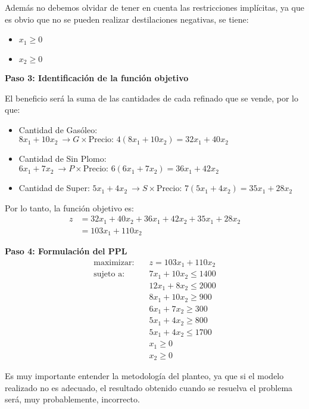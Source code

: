\noindent Además no debemos olvidar de tener en cuenta las restricciones implícitas, ya que es obvio que no se pueden realizar destilaciones negativas, se tiene:
\begin{itemize}
  \item \(x_1 \geq 0\)
  \item \(x_2 \geq 0\)
\end{itemize}

\noindent\textbf{Paso 3: Identificación de la función objetivo}

El beneficio será la suma de las cantidades de cada refinado que se vende, por lo que:
\begin{itemize}
  \item Cantidad de Gasóleo: \(8x_1 + 10x_2 ~ \rightarrow G \times \text{Precio: } 4(8x_1 + 10x_2) = 32x_1 + 40x_2\)
  \item Cantidad de Sin Plomo: \(6x_1 + 7x_2 ~ \rightarrow P \times \text{Precio: } 6(6x_1 + 7x_2) = 36x_1 + 42x_2\)
  \item Cantidad de Super: \(5x_1 + 4x_2 ~ \rightarrow S \times \text{Precio: } 7(5x_1 + 4x_2) = 35x_1 + 28x_2\) 
\end{itemize}

\noindent Por lo tanto, la función objetivo es:
\begin{align*}
  z &= 32x_1 + 40x_2 + 36x_1 + 42x_2 + 35x_1 + 28x_2 \\
    &= 103x_1 + 110x_2
\end{align*}

\noindent\textbf{Paso 4: Formulación del PPL}
\begin{align*}
  \text{maximizar:} \quad   &z = 103x_1 + 110x_2 \\[3pt]
  \text{sujeto a:} \quad    &7x_1 + 10x_2 \leq 1400 \\
                            &12x_1 + 8x_2 \leq 2000 \\
                            &8x_1 + 10x_2 \geq 900 \\
                            &6x_1 + 7x_2 \geq 300 \\
                            &5x_1 + 4x_2 \geq 800 \\
                            & 5x_1 + 4x_2 \leq 1700 \\
                            &x_1 \geq 0 \\
                            &x_2 \geq 0
\end{align*}

Es muy importante entender la metodología del planteo, ya que si el modelo realizado no es adecuado, el resultado obtenido cuando se resuelva el problema será, muy probablemente, incorrecto.

